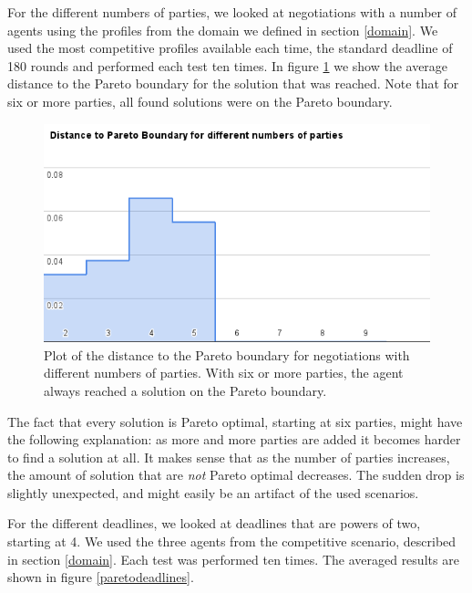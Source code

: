 \documentclass[a4,11pt]{scrartcl}
\begin{document}
For the different numbers of parties, we looked at negotiations with
a number of agents using the profiles from the domain we defined in section \ref{domain}.
We used the most competitive profiles available each time, the standard
deadline of 180 rounds and performed each test ten times. In figure
\ref{paretoparties} we show the average distance to the Pareto boundary
for the solution that was reached. Note that for six or more parties,
all found solutions were on the Pareto boundary.

\begin{figure}[t]
    \includegraphics[width=\textwidth]{paretoparties.png}
    \caption{Plot of the distance to the Pareto boundary for negotiations
    with different numbers of parties. With six or more parties, the
    agent always reached a solution on the Pareto boundary.}
    \label{paretoparties}
\end{figure}

The fact that every solution is Pareto optimal, starting at six parties,
might have the following explanation: as more and more parties are added
it becomes harder to find a solution at all. It makes sense that as the
number of parties increases, the amount of solution that are \emph{not}
Pareto optimal decreases. The sudden drop is slightly unexpected, and
might easily be an artifact of the used scenarios.

For the different deadlines, we looked at deadlines that are powers of 
two, starting at 4. We used the three agents from the competitive 
scenario, described in section \ref{domain}. Each test was performed 
ten times. The averaged results are shown in figure 
\ref{paretodeadlines}.
\end{document}

